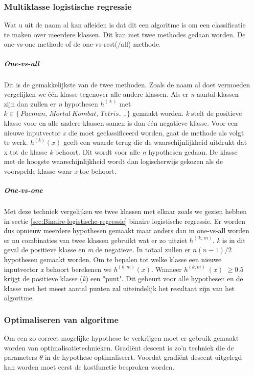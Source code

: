\subsubsection{Multiklasse logistische regressie}
\label{sec:Multiklasse-logistische-regressie}
Wat u uit de naam al kan afleiden is dat dit een algoritme is om een classificatie te maken over meerdere klassen. Dit kan met twee methodes gedaan worden. De one-vs-one methode of de one-vs-rest(/all) methode. 
\subparagraph{One-vs-all}
Dit is de gemakkelijkste van de twee methoden. Zoals de naam al doet vermoeden vergelijken we één klasse tegenover alle andere klassen. Als er \textit{n} aantal klassen zijn dan zullen er \textit{n} hypothesen $h^{(\,k\,)}$ met $k \in \{\,Pacman, \, Mortal \:Kombat, \, Tetris, \,..\}$ gemaakt worden. \textit{k} stelt de positieve klasse voor en alle andere klassen samen is dan één negatieve klasse. \newline
Voor een nieuwe inputvector \textit{x} die moet geclassificeerd worden, gaat de methode als volgt te werk. $h^{(k)} (x)$ geeft een waarde terug die de waarschijnlijkheid uitdrukt dat x tot de klasse \textit{k} behoort. Dit wordt voor alle \textit{n} hypothesen gedaan. De klasse met de hoogste waarschijnlijkheid wordt dan logischerwijs gekozen als de voorspelde klasse waar \textit{x} toe behoort. 
\subparagraph{One-vs-one}
Met deze techniek vergelijken we twee klassen met elkaar zoals we gezien hebben in sectie \ref{sec:Binaire-logistische-regressie} binaire logistische regressie. Er worden dus opnieuw meerdere hypothesen gemaakt maar anders dan in one-vs-all worden er nu combinaties van twee klassen gebruikt wat er zo uitziet $h^{(\,k,\,m)}$. \textit{k} is in dit geval de positieve klasse en \textit{m} de negatieve. In totaal zullen er $n(n-1)/2$ hypothesen gemaakt worden.
Om te bepalen tot welke klasse een nieuwe inputvector \textit{x} behoort berekenen we $h^{(k,m)}(x)$. Wanneer $h^{(k,m)}\;(x)$ $\geq 0.5$ krijgt de positieve klasse (\textit{k}) een "punt". Dit gebeurt voor alle hypothesen en de klasse met het meest aantal punten zal uiteindelijk het resultaat zijn van het algoritme. 

\subsubsection{Optimaliseren van algoritme}
\label{sec:Optimaliseren-algoritme}
Om een zo correct mogelijke hypothese te verkrijgen moet er gebruik gemaakt worden van optimalisatietechnieken. Gradiënt descent is zo'n techniek die de parameters $\theta$ in de hypothese optimaliseert. Voordat gradiënt descent uitgelegd kan worden moet eerst de kostfunctie besproken worden. 

